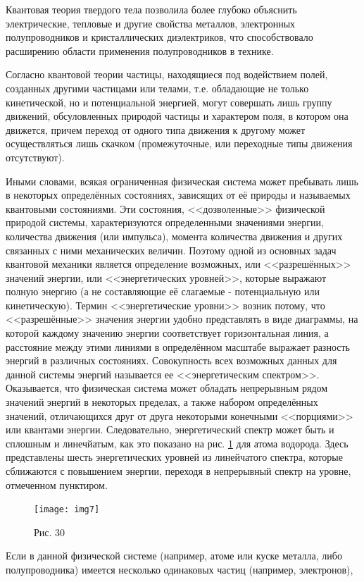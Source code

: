 \documentclass[a4paper,10pt]{book}
\begin{document}
Квантовая теория твердого тела позволила более глубоко объяснить электрические, тепловые и другие свойства металлов, электронных полупроводников и кристаллических диэлектриков, что способствовало расширению области применения полупроводников в технике.

Согласно квантовой теории частицы, находящиеся под водействием полей, созданных другими частицами или телами, т.е. обладающие не только кинетической, но и потенциальной энергией, могут совершать лишь группу движений, обсуловленных природой частицы и характером поля, в котором она движется, причем переход от одного типа движения к другому может осуществляться лишь скачком (промежуточные, или переходные типы движения отсутствуют).

Иными словами, всякая ограниченная физическая система может пребывать лишь в некоторых определённых состояниях, зависящих от её природы и называемых квантовыми состояниями. Эти состояния, <<дозволенные>> физической природой системы, характеризуются определенными значениями энергии, количества движения (или импульса), момента количества движения и других связанных с ними механических величин. Поэтому одной из основных задач квантовой механики является определение возможных, или <<разрешённых>> значений энергии, или <<энергетических уровней>>, которые выражают полную энергию (а не составляющие её слагаемые - потенциальную или кинетическую). Термин <<энергетические уровни>> возник потому, что <<разрешённые>> значения энергии удобно представлять в виде диаграммы, на которой каждому значению энергии соответствует горизонтальная линия, а расстояние между этими линиями в определённом масштабе выражает разность энергий в различных состояниях. Совокупность всех возможных данных для данной системы энергий называется ее <<энергетическим спектром>>. Оказывается, что физическая система может обладать непрерывным рядом значений энергий в некоторых пределах, а также набором определённых значений, отличающихся друг от друга некоторыми конечными <<порциями>> или квантами энергии. 
Следовательно, энергетический спектр может быть и сплошным и линечйатым, как это показано на рис. \ref{img8} для атома водорода. Здесь представлены шесть энергетических уровней из линейчатого спектра, которые сближаются с повышением энергии, переходя в непрерывный спектр на уровне, отмеченном пунктиром.
\begin{figure}[h]
\texttt{[image: img7]}
\caption{Рис. 30}
\label{img8}
\end{figure}
Если в данной физической системе (например, атоме или куске металла, либо полупроводника) имеется несколько одинаковых частиц (например, электронов),
\end{document}
